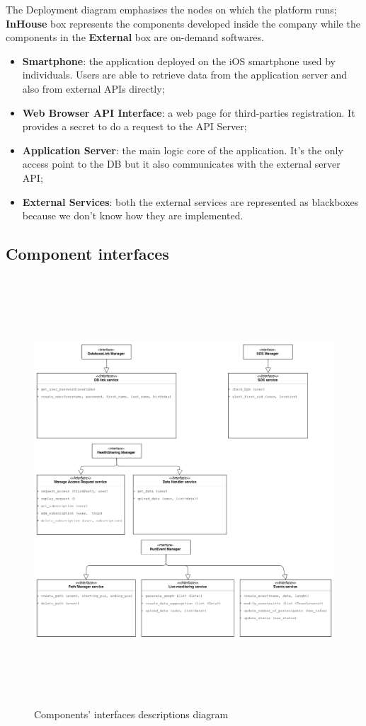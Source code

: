\documentclass[DD.tex]{subfiles}
\begin{document}
The Deployment diagram emphasises the nodes on which the platform runs;\\
\textbf{InHouse} box represents the components developed inside the company while 
the components in the \textbf{External} box are on-demand softwares.\\
\begin{itemize}
\item	\textbf{Smartphone}: the application deployed on the iOS smartphone used by individuals. Users are able to retrieve data from the application server and also from external APIs directly;
\item \textbf{Web Browser API Interface}: a web page for third-parties registration. It provides a secret to do a request to the API Server;
\item \textbf{Application Server}: the  main logic core of the application. It’s the only access point to the DB but it also communicates with the external server API;
\item  \textbf{External Services}: both the external services are represented as  blackboxes because we don't know how they are implemented.
\end{itemize}
\newpage

	
	
\newpage
\subsection{Component interfaces}
\begin{figure}[h!]
	\centering
	\includegraphics[height=16.00cm,keepaspectratio]{Figures/Interfaces}
	\caption{Components' interfaces descriptions diagram}
\end{figure}
\end{document}
